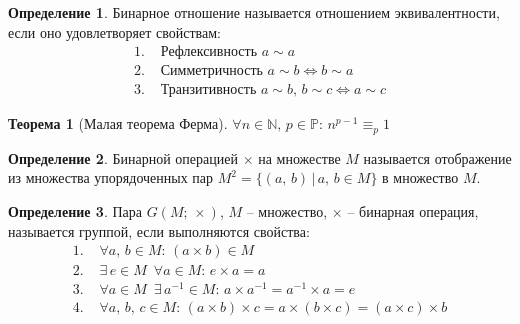 \documentclass[12pt]{article}
\theoremstyle{definition}
\newtheorem{theorem}{Теорема}[section]
\newtheorem{definition}{Определение}
\newcommand{\N}{\mathbb{N}}
\newcommand{\prob}{\mathbb{P}}
\begin{document}
\begin{definition}
    Бинарное отношение называется отношением эквивалентности, если оно удовлетворяет свойствам:
    \begin{align*}
        1.\,\,&\text{Рефлексивность } a\sim a\\
        2.\,\,&\text{Симметричность } a\sim b \Longleftrightarrow b\sim a\\
        3.\,\,&\text{Транзитивность } a\sim b,\, b\sim c \Longleftrightarrow a\sim c
    \end{align*}
\end{definition}
\begin{theorem}[Малая теорема Ферма]
    $\forall n\in \N,\, p\in \prob:\, n^{p-1}\equiv_p 1$
\end{theorem}
\begin{definition}
    Бинарной операцией $\times$ на множестве $M$ называется отображение из множества упорядоченных пар $M^2=\{(a,\,b)\,|\,a,\,b\in M\}$ в множество $M$.
\end{definition}
\begin{definition}
    Пара $G(M;\,\times)$, $M$ -- множество, $\times$ -- бинарная операция, называется группой, если выполняются свойства:
    \begin{align*}
        1.\,\,&\forall a,\,b\in M:\,(a\times b)\in M\\
        2.\,\,&\exists\, e\in M\,\,\,\forall a\in M:\, e\times a=a\\
        3.\,\,&\forall a\in M\,\,\, \exists\, a^{-1}\in M:\, a\times a^{-1}=a^{-1}\times a=e\\
        4.\,\,&\forall a,\,b,\,c \in M:\,(a\times b)\times c=a\times(b\times c)= (a\times c)\times b
    \end{align*}
\end{definition}
\end{document}
